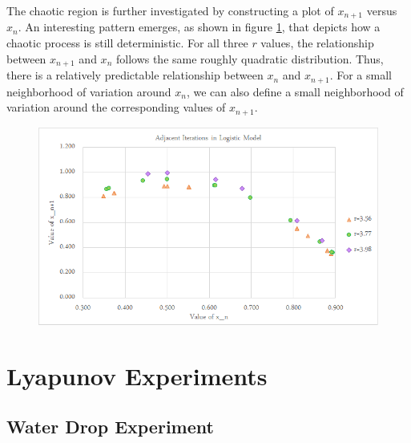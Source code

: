 \documentclass[a4paper]{article}
\begin{document}
The chaotic region is further investigated by constructing a plot of $x_{n+1}$ versus $x_n$. An interesting pattern emerges, as shown in figure \ref{chaos_n1vn}, that depicts how a chaotic process is still deterministic. For all three $r$ values, the relationship between $x_{n+1}$ and $x_n$ follows the same roughly quadratic distribution. Thus, there is a relatively predictable relationship between $x_n$ and $x_{n+1}$. For a small neighborhood of variation around $x_n$, we can also define a small neighborhood of variation around the corresponding values of $x_{n+1}$.

\begin{figure}[H]
\centering
\includegraphics[width=1\textwidth]{chaos_n1vn.png}
\label{chaos_n1vn}
\end{figure}

\section{Lyapunov Experiments}

\subsection{Water Drop Experiment}
\end{document}
